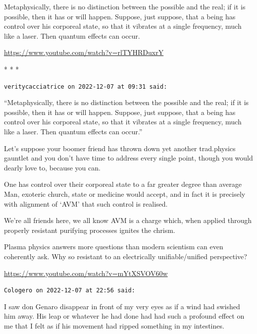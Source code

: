 Metaphysically, there is no distinction between the possible and the real; if it is possible, then it has or will happen. Suppose, just suppose, that a being has control over his corporeal state, so that it vibrates at a single frequency, much like a laser. Then quantum effects can occur.

\url{https://www.youtube.com/watch?v=rlTYHRDuxrY}


\begin{center}* * *\end{center}

\begin{footnotesize}
\begin{sffamily}
\texttt{veritycacciatrice on 2022-12-07 at 09:31 said:}

``Metaphysically, there is no distinction between the possible and the real; if it is possible, then it has or will happen. Suppose, just suppose, that a being has control over his corporeal state, so that it vibrates at a single frequency, much like a laser. Then quantum effects can occur.''

Let's suppose your boomer friend has thrown down yet another trad.physics gauntlet and you don't have time to address every single point, though you would dearly love to, because you can.

One has control over their corporeal state to a far greater degree than average Man, exoteric church, state or medicine would accept, and in fact it is precisely with alignment of `AVM' that such control is realised.

We're all friends here, we all know AVM is a charge which, when applied through properly resistant purifying processes ignites the chrism.

Plasma physics answers more questions than modern scientism can even coherently ask. Why so resistant to an electrically unifiable/unified perspective?

\url{https://www.youtube.com/watch?v=mYtXSVOV60w}


\hfill

\texttt{Cologero on 2022-12-07 at 22:56 said:}

\begin{quotex}\footnotesize
I saw don Genaro disappear in front of my very eyes as if a wind had swished him away. His leap or whatever he had done had had such a profound effect on me that I felt as if his movement had ripped something in my intestines. 
\end{quotex}


\end{sffamily}
\end{footnotesize}
